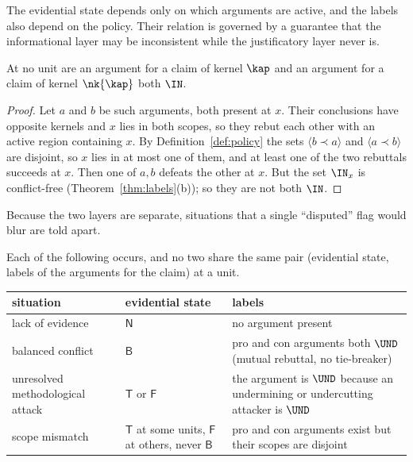The evidential state depends only on which arguments are active, and the labels also depend on the policy. Their relation is governed by a guarantee that the informational layer may be inconsistent while the justificatory layer never is.

\begin{proposition}\label{prop:noboth}
At no unit are an argument for a claim of kernel $\kap$ and an argument for a claim of kernel $\nk{\kap}$ both $\IN$.
\end{proposition}

\begin{proof}
Let $a$ and $b$ be such arguments, both present at $x$. Their conclusions have opposite kernels and $x$ lies in both scopes, so they rebut each other with an active region containing $x$. By Definition~\ref{def:policy} the sets $\langle b\prec a\rangle$ and $\langle a\prec b\rangle$ are disjoint, so $x$ lies in at most one of them, and at least one of the two rebuttals succeeds at $x$. Then one of $a,b$ defeats the other at $x$. But the set $\IN_x$ is conflict-free (Theorem~\ref{thm:labels}(b)); so they are not both $\IN$.
\end{proof}

Because the two layers are separate, situations that a single ``disputed'' flag would blur are told apart.

\begin{proposition}\label{prop:foursit}
Each of the following occurs, and no two share the same pair (evidential state, labels of the arguments for the claim) at a unit.
\begin{center}
\small
\begin{tabularx}{\textwidth}{@{}l l X@{}}
\toprule
situation & evidential state & labels\\
\midrule
lack of evidence & $\mathsf N$ & no argument present\\
balanced conflict & $\mathsf B$ & pro and con arguments both $\UND$ (mutual rebuttal, no tie-breaker)\\
unresolved methodological attack & $\mathsf T$ or $\mathsf F$ & the argument is $\UND$ because an undermining or undercutting attacker is $\UND$\\
scope mismatch & $\mathsf T$ at some units, $\mathsf F$ at others, never $\mathsf B$ & pro and con arguments exist but their scopes are disjoint\\
\bottomrule
\end{tabularx}
\end{center}
\end{proposition}

